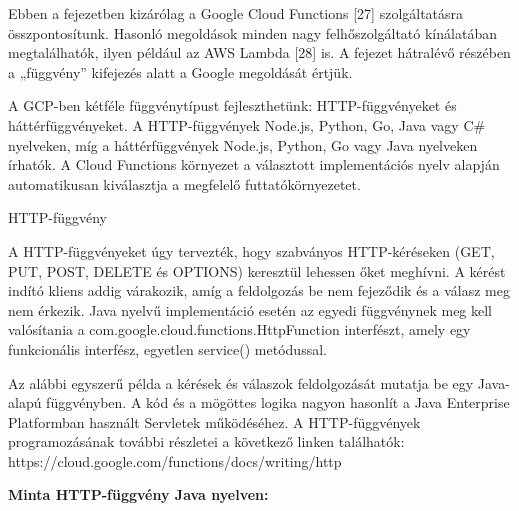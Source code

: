 \documentclass[
]{article}
\begin{document}
Ebben a fejezetben kizárólag a Google Cloud Functions {[}27{]}
szolgáltatásra összpontosítunk. Hasonló megoldások minden nagy
felhőszolgáltató kínálatában megtalálhatók, ilyen például az AWS Lambda
{[}28{]} is. A fejezet hátralévő részében a „függvény'' kifejezés alatt
a Google megoldását értjük.

A GCP-ben kétféle függvénytípust fejleszthetünk: HTTP-függvényeket és
háttérfüggvényeket. A HTTP-függvények Node.js, Python, Go, Java vagy C\#
nyelveken, míg a háttérfüggvények Node.js, Python, Go vagy Java
nyelveken írhatók. A Cloud Functions környezet a választott
implementációs nyelv alapján automatikusan kiválasztja a megfelelő
futtatókörnyezetet.

HTTP-függvény

A HTTP-függvényeket úgy tervezték, hogy szabványos HTTP-kéréseken (GET,
PUT, POST, DELETE és OPTIONS) keresztül lehessen őket meghívni. A kérést
indító kliens addig várakozik, amíg a feldolgozás be nem fejeződik és a
válasz meg nem érkezik. Java nyelvű implementáció esetén az egyedi
függvénynek meg kell valósítania a
com.google.cloud.functions.HttpFunction interfészt, amely egy
funkcionális interfész, egyetlen service() metódussal.

Az alábbi egyszerű példa a kérések és válaszok feldolgozását mutatja be
egy Java-alapú függvényben. A kód és a mögöttes logika nagyon hasonlít a
Java Enterprise Platformban használt Servletek működéséhez. A
HTTP-függvények programozásának további részletei a következő linken
találhatók: https://cloud.google.com/functions/docs/writing/http

\textbf{Minta HTTP-függvény Java nyelven:}
\end{document}
